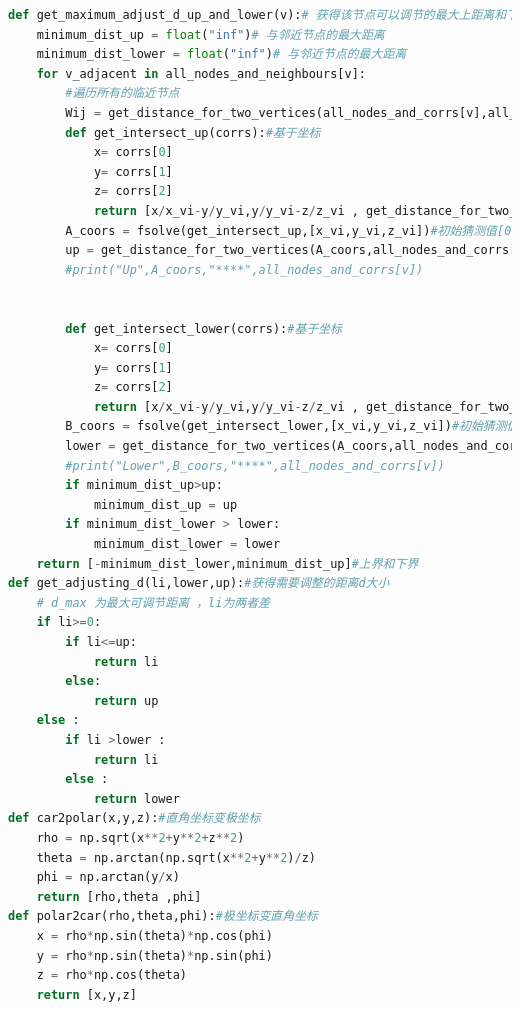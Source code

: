\documentclass[withoutpreface,bwprint]{cumcmthesis} %
\begin{document}
\begin{appendices}
\begin{lstlisting}[language=python]
def get_maximum_adjust_d_up_and_lower(v):# 获得该节点可以调节的最大上距离和下距离
    minimum_dist_up = float("inf")# 与邻近节点的最大距离
    minimum_dist_lower = float("inf")# 与邻近节点的最大距离
    for v_adjacent in all_nodes_and_neighbours[v]:
        #遍历所有的临近节点
        Wij = get_distance_for_two_vertices(all_nodes_and_corrs[v],all_nodes_and_corrs[v_adjacent])
        def get_intersect_up(corrs):#基于坐标
            x= corrs[0]
            y= corrs[1]
            z= corrs[2]
            return [x/x_vi-y/y_vi,y/y_vi-z/z_vi , get_distance_for_two_vertices([x,y,z],all_nodes_and_corrs[v_adjacent])-Wij*(1-0.0007)]
        A_coors = fsolve(get_intersect_up,[x_vi,y_vi,z_vi])#初始猜测值[0,-1]
        up = get_distance_for_two_vertices(A_coors,all_nodes_and_corrs[v])
        #print("Up",A_coors,"****",all_nodes_and_corrs[v])
        
        
        def get_intersect_lower(corrs):#基于坐标
            x= corrs[0]
            y= corrs[1]
            z= corrs[2]
            return [x/x_vi-y/y_vi,y/y_vi-z/z_vi , get_distance_for_two_vertices([x,y,z],all_nodes_and_corrs[v_adjacent])-Wij*(1+0.0007)]
        B_coors = fsolve(get_intersect_lower,[x_vi,y_vi,z_vi])#初始猜测值[0,-1]
        lower = get_distance_for_two_vertices(A_coors,all_nodes_and_corrs[v])
        #print("Lower",B_coors,"****",all_nodes_and_corrs[v])
        if minimum_dist_up>up:
            minimum_dist_up = up
        if minimum_dist_lower > lower:
            minimum_dist_lower = lower 
    return [-minimum_dist_lower,minimum_dist_up]#上界和下界
def get_adjusting_d(li,lower,up):#获得需要调整的距离d大小
    # d_max 为最大可调节距离 ，li为两者差
    if li>=0:
        if li<=up:
            return li
        else:
            return up
    else :
        if li >lower :
            return li
        else :
            return lower 
def car2polar(x,y,z):#直角坐标变极坐标
    rho = np.sqrt(x**2+y**2+z**2)
    theta = np.arctan(np.sqrt(x**2+y**2)/z)
    phi = np.arctan(y/x)
    return [rho,theta ,phi]
def polar2car(rho,theta,phi):#极坐标变直角坐标
    x = rho*np.sin(theta)*np.cos(phi)
    y = rho*np.sin(theta)*np.sin(phi)
    z = rho*np.cos(theta)
    return [x,y,z]


\end{lstlisting}
\end{appendices}
\end{document}
